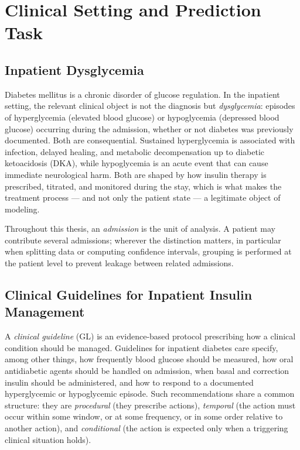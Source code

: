 \section{Clinical Setting and Prediction Task}

\subsection{Inpatient Dysglycemia}

Diabetes mellitus is a chronic disorder of glucose regulation. In the inpatient setting, the relevant clinical object is not the diagnosis but \emph{dysglycemia}: episodes of hyperglycemia (elevated blood glucose) or hypoglycemia (depressed blood glucose) occurring during the admission, whether or not diabetes was previously documented. Both are consequential. Sustained hyperglycemia is associated with infection, delayed healing, and metabolic decompensation up to diabetic ketoacidosis (DKA), while hypoglycemia is an acute event that can cause immediate neurological harm. Both are shaped by how insulin therapy is prescribed, titrated, and monitored during the stay, which is what makes the treatment process --- and not only the patient state --- a legitimate object of modeling.

Throughout this thesis, an \emph{admission} is the unit of analysis. A patient may contribute several admissions; wherever the distinction matters, in particular when splitting data or computing confidence intervals, grouping is performed at the patient level to prevent leakage between related admissions.

\subsection{Clinical Guidelines for Inpatient Insulin Management}

A \emph{clinical guideline} (GL) is an evidence-based protocol prescribing how a clinical condition should be managed. Guidelines for inpatient diabetes care specify, among other things, how frequently blood glucose should be measured, how oral antidiabetic agents should be handled on admission, when basal and correction insulin should be administered, and how to respond to a documented hyperglycemic or hypoglycemic episode. Such recommendations share a common structure: they are \emph{procedural} (they prescribe actions), \emph{temporal} (the action must occur within some window, or at some frequency, or in some order relative to another action), and \emph{conditional} (the action is expected only when a triggering clinical situation holds).

